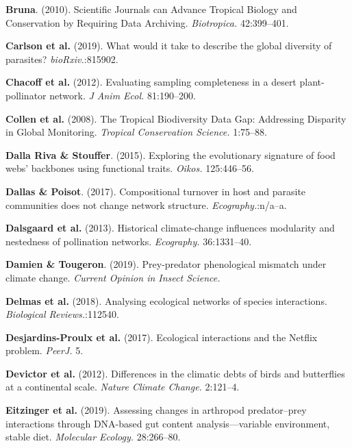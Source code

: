 \leavevmode\hypertarget{ref-Brun10}{}%
\textbf{Bruna}. (2010). Scientific Journals can Advance Tropical Biology
and Conservation by Requiring Data Archiving. \emph{Biotropica.}
42:399--401.

\leavevmode\hypertarget{ref-CarlPhil19}{}%
\textbf{Carlson et al.} (2019). What would it take to describe the
global diversity of parasites? \emph{bioRxiv.}:815902.

\leavevmode\hypertarget{ref-ChacVazq12}{}%
\textbf{Chacoff et al.} (2012). Evaluating sampling completeness in a
desert plant-pollinator network. \emph{J Anim Ecol.} 81:190--200.

\leavevmode\hypertarget{ref-CollRam08}{}%
\textbf{Collen et al.} (2008). The Tropical Biodiversity Data Gap:
Addressing Disparity in Global Monitoring. \emph{Tropical Conservation
Science.} 1:75--88.

\leavevmode\hypertarget{ref-DallStou15}{}%
\textbf{Dalla Riva \& Stouffer}. (2015). Exploring the evolutionary
signature of food webs' backbones using functional traits. \emph{Oikos.}
125:446--56.

\leavevmode\hypertarget{ref-DallPois17}{}%
\textbf{Dallas \& Poisot}. (2017). Compositional turnover in host and
parasite communities does not change network structure.
\emph{Ecography.}:n/a--a.

\leavevmode\hypertarget{ref-DalsTroj13}{}%
\textbf{Dalsgaard et al.} (2013). Historical climate-change influences
modularity and nestedness of pollination networks. \emph{Ecography.}
36:1331--40.

\leavevmode\hypertarget{ref-DamiToug19}{}%
\textbf{Damien \& Tougeron}. (2019). Prey-predator phenological mismatch
under climate change. \emph{Current Opinion in Insect Science.}

\leavevmode\hypertarget{ref-DelmBess18}{}%
\textbf{Delmas et al.} (2018). Analysing ecological networks of species
interactions. \emph{Biological Reviews.}:112540.

\leavevmode\hypertarget{ref-DesjLaig17}{}%
\textbf{Desjardins-Proulx et al.} (2017). Ecological interactions and
the Netflix problem. \emph{PeerJ.} 5.

\leavevmode\hypertarget{ref-Devivan12}{}%
\textbf{Devictor et al.} (2012). Differences in the climatic debts of
birds and butterflies at a continental scale. \emph{Nature Climate
Change.} 2:121--4.

\leavevmode\hypertarget{ref-EitzAbre19}{}%
\textbf{Eitzinger et al.} (2019). Assessing changes in arthropod
predator--prey interactions through DNA-based gut content
analysis---variable environment, stable diet. \emph{Molecular Ecology.}
28:266--80.

